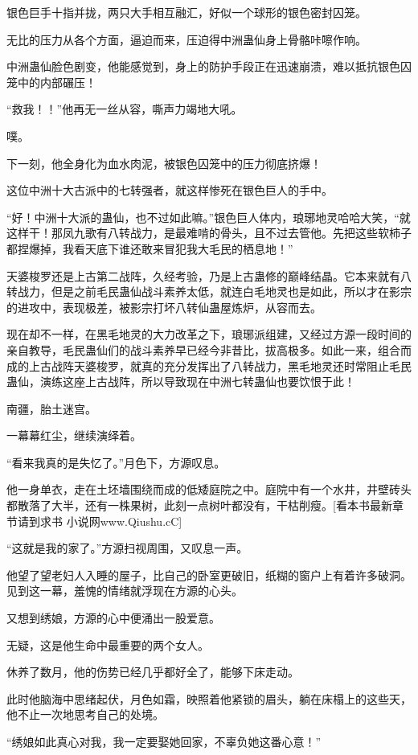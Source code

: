 \begin{this_body}
银色巨手十指并拢，两只大手相互融汇，好似一个球形的银色密封囚笼。

无比的压力从各个方面，逼迫而来，压迫得中洲蛊仙身上骨骼咔嚓作响。

中洲蛊仙脸色剧变，他能感觉到，身上的防护手段正在迅速崩溃，难以抵抗银色囚笼中的内部碾压！

“救我！！”他再无一丝从容，嘶声力竭地大吼。

噗。

下一刻，他全身化为血水肉泥，被银色囚笼中的压力彻底挤爆！

这位中洲十大古派中的七转强者，就这样惨死在银色巨人的手中。

“好！中洲十大派的蛊仙，也不过如此嘛。”银色巨人体内，琅琊地灵哈哈大笑，“就这样干！那凤九歌有八转战力，是最难啃的骨头，且不过去管他。先把这些软柿子都捏爆掉，我看天底下谁还敢来冒犯我大毛民的栖息地！”

天婆梭罗还是上古第二战阵，久经考验，乃是上古蛊修的巅峰结晶。它本来就有八转战力，但是之前毛民蛊仙战斗素养太低，就连白毛地灵也是如此，所以才在影宗的进攻中，表现极差，被影宗打坏八转仙蛊屋炼炉，从容而去。

现在却不一样，在黑毛地灵的大力改革之下，琅琊派组建，又经过方源一段时间的亲自教导，毛民蛊仙们的战斗素养早已经今非昔比，拔高极多。如此一来，组合而成的上古战阵天婆梭罗，就真的充分发挥出了八转战力，黑毛地灵还时常阻止毛民蛊仙，演练这座上古战阵，所以导致现在中洲七转蛊仙也要饮恨于此！

南疆，胎土迷宫。

一幕幕红尘，继续演绎着。

“看来我真的是失忆了。”月色下，方源叹息。

他一身单衣，走在土坯墙围绕而成的低矮庭院之中。庭院中有一个水井，井壁砖头都散落了大半，还有一株果树，此刻一点树叶都没有，干枯削瘦。[看本书最新章节请到求书 小说网www.Qiushu.cC]

“这就是我的家了。”方源扫视周围，又叹息一声。

他望了望老妇人入睡的屋子，比自己的卧室更破旧，纸糊的窗户上有着许多破洞。见到这一幕，羞愧的情绪就浮现在方源的心头。

又想到绣娘，方源的心中便涌出一股爱意。

无疑，这是他生命中最重要的两个女人。

休养了数月，他的伤势已经几乎都好全了，能够下床走动。

此时他脑海中思绪起伏，月色如霜，映照着他紧锁的眉头，躺在床榻上的这些天，他不止一次地思考自己的处境。

“绣娘如此真心对我，我一定要娶她回家，不辜负她这番心意！”


\end{this_body}
